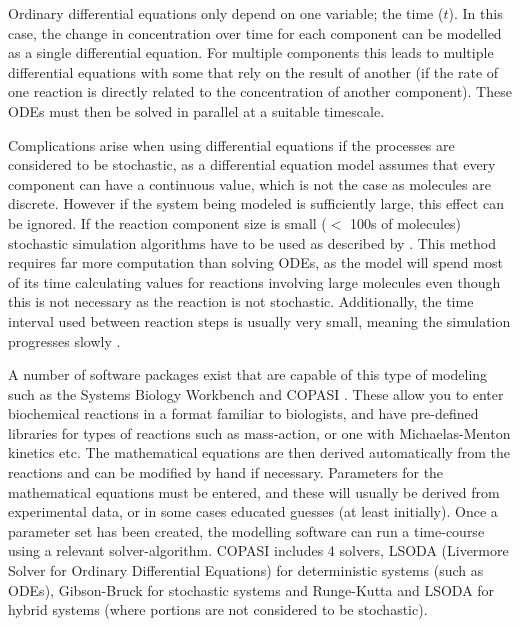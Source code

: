 Ordinary differential equations only depend on one variable; the time ($t$). In this case, the change in concentration over time for each component can be modelled as a single differential equation. For multiple components this leads to multiple differential equations with some that rely on the result of another (if the rate of one reaction is directly related to the concentration of another component). These ODEs must then be solved in parallel at a suitable timescale.

Complications arise when using differential equations if the processes are considered to be stochastic, as a differential equation model assumes that every component can have a continuous value, which is not the case as molecules are discrete. However if the system being modeled is sufficiently large, this effect can be ignored. If the reaction component size is small ($<$ 100s of molecules) stochastic simulation algorithms have to be used as described by \citet{Gillespie1977}. This method requires far more computation than solving ODEs, as the model will spend most of its time calculating values for reactions involving large molecules even though this is not necessary as the reaction is not stochastic. Additionally, the time interval used between reaction steps is usually very small, meaning the simulation progresses slowly \cite{Klipp2005}.

A number of software packages exist that are capable of this type of modeling such as the Systems Biology Workbench \cite{Sauro2003} and COPASI \cite{StefanHoops12152006}. These allow you to enter biochemical reactions in a format familiar to biologists, and have pre-defined libraries for types of reactions such as mass-action, or one with Michaelas-Menton kinetics etc. The mathematical equations are then derived automatically from the reactions and can be modified by hand if necessary. Parameters for the mathematical equations must be entered, and these will usually be derived from experimental data, or in some cases educated guesses (at least initially). Once a parameter set has been created, the modelling software can run a time-course using a relevant solver-algorithm. COPASI includes 4 solvers,  LSODA (Livermore Solver for Ordinary Differential Equations) \cite{RH93} for deterministic systems (such as ODEs), Gibson-Bruck \cite{Gibson2000} for stochastic systems and Runge-Kutta and LSODA for hybrid systems (where portions are not considered to be stochastic).